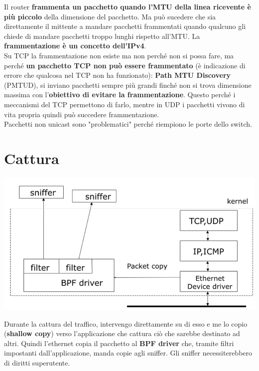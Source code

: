 \documentclass[10pt]{book}
\begin{document}
Il router \textbf{frammenta un pacchetto quando l'MTU della linea ricevente è più piccolo} della dimensione del pacchetto. Ma può sucedere che sia direttamente il mittente a mandare pacchetti frammentati quando qualcuno gli chiede di mandare pacchetti troppo lunghi rispetto all'MTU. La \textbf{frammentazione è un concetto dell'IPv4}.\\
Su TCP la frammentazione non esiste ma non perché non si possa fare, ma perché \textbf{un pacchetto TCP non può essere frammentato} (è indicazione di errore che qualcosa nel TCP non ha funzionato): \textbf{Path MTU Discovery} (PMTUD), si inviano pacchetti sempre più grandi finché non si trova dimensione massima con l'\textbf{obiettivo di evitare la frammentazione}. Questo perché i meccanismi del TCP permettono di farlo, mentre in UDP i pacchetti vivono di vita propria quindi può succedere frammentazione.\\
Pacchetti non unicast sono "problematici" perché riempiono le porte dello switch.

\chapter{Cattura}
\begin{center}
	\includegraphics[scale=0.75]{cattura.png}
\end{center}
Durante la cattura del traffico, intervengo direttamente su di esso e me lo copio (\textbf{shallow copy}) verso l'applicazione che cattura ciò che sarebbe destinato ad altri. Quindi l'ethernet copia il pacchetto al \textbf{BPF driver} che, tramite filtri impostanti dall'applicazione, manda copie agli sniffer. Gli sniffer necessiterebbero di diritti superutente.
\end{document}
